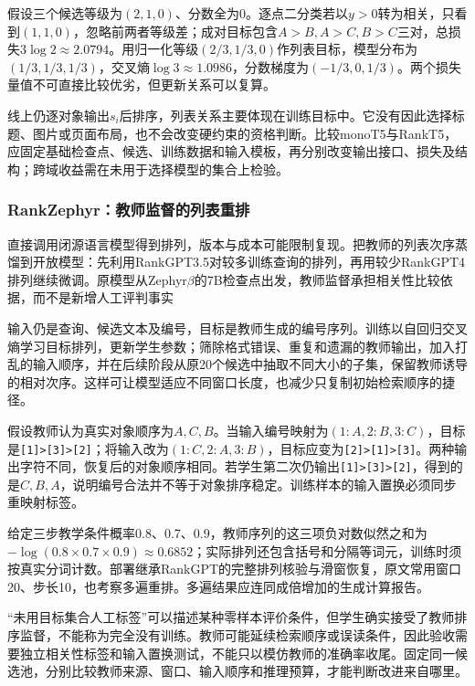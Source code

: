 假设三个候选等级为$(2,1,0)$、分数全为0。逐点二分类若以$y>0$转为相关，只看到$(1,1,0)$，忽略前两者等级差；成对目标包含$A>B,A>C,B>C$三对，总损失$3\log2\approx2.0794$。用归一化等级$(2/3,1/3,0)$作列表目标，模型分布为$(1/3,1/3,1/3)$，交叉熵$\log3\approx1.0986$，分数梯度为$(-1/3,0,1/3)$。两个损失量值不可直接比较优劣，但更新关系可以复算。

线上仍逐对象输出$s_i$后排序，列表关系主要体现在训练目标中。它没有因此选择标题、图片或页面布局，也不会改变硬约束的资格判断。比较monoT5与RankT5，应固定基础检查点、候选、训练数据和输入模板，再分别改变输出接口、损失及结构；跨域收益需在未用于选择模型的集合上检验。

\Needspace{100mm}
\subsubsection{RankZephyr：教师监督的列表重排}
\label{sec:rs-search-rankzephyr}

直接调用闭源语言模型得到排列，版本与成本可能限制复现。把教师的列表次序蒸馏到开放模型：先利用RankGPT3.5对较多训练查询的排列，再用较少RankGPT4排列继续微调。原模型从Zephyr$\beta$的7B检查点出发，教师监督承担相关性比较依据，而不是新增人工评判事实

输入仍是查询、候选文本及编号，目标是教师生成的编号序列。训练以自回归交叉熵学习目标排列，更新学生参数；筛除格式错误、重复和遗漏的教师输出，加入打乱的输入顺序，并在后续阶段从原20个候选中抽取不同大小的子集，保留教师诱导的相对次序。这样可让模型适应不同窗口长度，也减少只复制初始检索顺序的捷径。

假设教师认为真实对象顺序为$A,C,B$。当输入编号映射为$(1:A,2:B,3:C)$，目标是\texttt{[1]>[3]>[2]}；将输入改为$(1:C,2:A,3:B)$，目标应变为\texttt{[2]>[1]>[3]}。两种输出字符不同，恢复后的对象顺序相同。若学生第二次仍输出\texttt{[1]>[3]>[2]}，得到的是$C,B,A$，说明编号合法并不等于对象排序稳定。训练样本的输入置换必须同步重映射标签。

给定三步教学条件概率0.8、0.7、0.9，教师序列的这三项负对数似然之和为$-\log(0.8\times0.7\times0.9)\approx0.6852$；实际排列还包含括号和分隔等词元，训练时须按真实分词计数。部署继承RankGPT的完整排列核验与滑窗恢复，原文常用窗口20、步长10，也考察多遍重排。多遍结果应连同成倍增加的生成计算报告。

“未用目标集合人工标签”可以描述某种零样本评价条件，但学生确实接受了教师排序监督，不能称为完全没有训练。教师可能延续检索顺序或误读条件，因此验收需要独立相关性标签和输入置换测试，不能只以模仿教师的准确率收尾。固定同一候选池，分别比较教师来源、窗口、输入顺序和推理预算，才能判断改进来自哪里。

